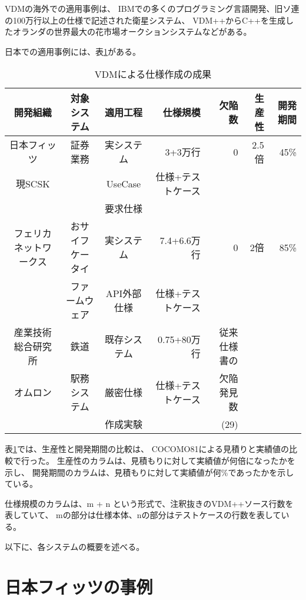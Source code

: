 VDMの海外での適用事例は、
IBMでの多くのプログラミング言語開発、旧ソ連の100万行以上の仕様で記述された衛星システム、
VDM++からC++を生成したオランダの世界最大の花市場オークションシステムなどがある。

日本での適用事例には、表\ref{VDMeffectTable}がある。

\begin{table}[h]
	\caption[VDMによる仕様作成の成果]{VDMによる仕様作成の成果}
	\label{VDMeffectTable}
	\begin{center}
		\setlength{\tabcolsep}{3pt}
		\begin{tabular}{|c|c|c|r|r|r|r|} \hline
			開発組織 & 対象システム & 適用工程 & 仕様規模 & 欠陥数 & 生産性 & 開発期間   \\ \hline\hline
			日本フィッツ& 証券業務 & 実システム & 3+3万行 & 0 & 2.5倍 & 45\%  \\ 
			現SCSK &  & UseCase & 仕様+テストケース &  &  &   \\ 
			 &  & 要求仕様 &  &  &  &   \\ \hline
			フェリカネットワークス & おサイフケータイ &  実システム & 7.4+6.6万行 & 0 & 2倍 & 85\% \\ 
			 & ファームウェア &  API外部仕様 & 仕様+テストケース &  &  &   \\ \hline
			産業技術総合研究所 & 鉄道 & 既存システム & 0.75+80万行 &  従来仕様書の & &   \\ 
			オムロン & 駅務システム & 厳密仕様 & 仕様+テストケース & 欠陥発見数 & &   \\ 
			 &  & 作成実験 &  & (29) & &   \\ \hline
		\end{tabular}
	\end{center}
\end{table}

表\ref{VDMeffectTable}では、生産性と開発期間の比較は、
COCOMO81\cite{Boehm81}による見積りと実績値の比較で行った。
生産性のカラムは、見積もりに対して実績値が何倍になったかを示し、
開発期間のカラムは、見積もりに対して実績値が何\%であったかを示している。

仕様規模のカラムは、m + n という形式で、注釈抜きのVDM++ソース行数を表していて、
mの部分は仕様本体、nの部分はテストケースの行数を表している。

以下に、各システムの概要を述べる。

\section{日本フィッツの事例}
	\label{JFITS}

